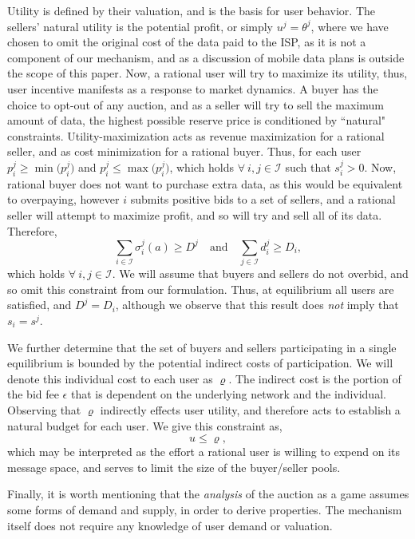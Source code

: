 \documentclass[sigconf, anonymous]{acmart}
\newcommand{\mcI}{\mathcal{I}}
\newcommand{\g}{\sigma}
\theoremstyle{definition}
\begin{document}
Utility is defined by their valuation, and is the basis for user behavior. 
The sellers' natural utility is the potential
profit, or simply $u^j = \theta^j$, where we have chosen to omit the original cost of the data
paid to the ISP, as it is not a component of our mechanism, and as a discussion
of mobile data plans is outside the scope of this paper.  
Now, a rational user will try
to maximize its utility, thus, user incentive manifests as a
response to market dynamics. A buyer has the choice to
opt-out of any auction, and as a seller will try to sell the maximum amount of
data, the highest possible reserve price is conditioned by ``natural" constraints. Utility-maximization 
acts as revenue maximization for a rational seller, and as cost minimization for a
rational buyer. Thus, for each user $p_i^j \ge \min\big(p_i^j)$ and $p_i^j \le
\max\big(p_i^j)$, which holds $\forall \ i, j\in\mcI$ such that $s_i^j>0$.
Now, rational buyer does not want to purchase extra data, as this would be
equivalent to overpaying, however $i$ submits positive bids to a set of
sellers, and a rational seller will attempt to maximize profit, and so will try and sell all of
its data. Therefore,
\begin{equation}\label{bidcap}
    \displaystyle\sum_{i\in\mcI} \g_i^j(a) \ge D^j \quad\text{and}\quad
\sum_{j\in\mcI} d^j_i \ge D_i,
\end{equation}
which holds $\forall \ i,j\in\mcI$. We will assume that buyers and sellers do not overbid, and so omit this
constraint from our formulation.
Thus, at equilibrium all users are satisfied, and 
$D^j = D_i$, although we observe that this result
does \emph{not} imply that $s_i=s^j$. 

We further determine that the set of buyers and sellers participating
in a single equilibrium is bounded by the potential indirect costs of
participation. We will denote this individual cost to each user as
$\varrho$. The indirect cost is the portion of the bid fee
$\epsilon$ that is dependent on the underlying network and the individual.
Observing that $\varrho$ indirectly effects user utility,
and therefore acts to establish a natural budget for each user. We give this
constraint as, 
\begin{equation}\label{poolbnd}
    u \le \varrho,
\end{equation}
which may be interpreted as the effort a rational user is willing to expend
on its message space, and serves to limit the size of the buyer/seller pools.
 
Finally, it is worth mentioning that the \emph{analysis} of the auction as
a game assumes some forms of demand and supply, in order to derive properties.
The mechanism itself does not require any knowledge of user demand or
valuation. 
\end{document}
